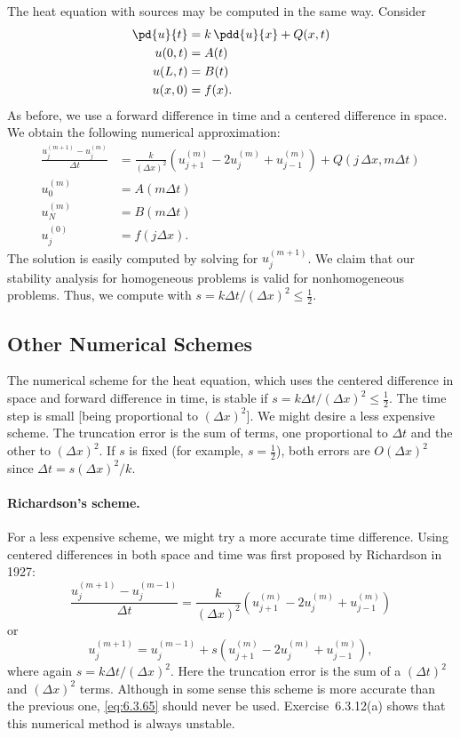 The heat equation with sources may be computed in the same way.  Consider
\begin{align*}
\pd{u}{t} &= k\,\pdd{u}{x} + Q(x,t) \\
u(0,t) &= A(t) \\
u(L,t) &= B(t) \\
u(x,0) &= f(x).
\end{align*}
As before, we use a forward difference in time and a centered difference in space.  We obtain the following numerical approximation:
\begin{align*}
\frac{u_j^{(m+1)} - u_j^{(m)}}{\Delta t} &= \frac{k}{(\Delta x)^2}\left(u_{j+1}^{(m)} - 2u_j^{(m)} + u_{j-1}^{(m)}\right) + Q(j\,\Delta x, m\Delta t) \\
u_0^{(m)} &= A(m\Delta t) \\
u_N^{(m)} &= B(m\Delta t) \\
u_j^{(0)} &= f(j\Delta x).
\end{align*}
The solution is easily computed by solving for $u_j^{(m+1)}$.  We claim that our stability analysis for homogeneous problems is valid for nonhomogeneous problems.  Thus, we compute with $s = k\Delta t/(\Delta x)^2 \le \frac{1}{2}$.

\subsection{Other Numerical Schemes}
\label{sec:fd-heat-other}

The numerical scheme for the heat equation, which uses the centered difference in space and forward difference in time, is stable if $s = k\Delta t/(\Delta x)^2 \le \frac{1}{2}$.  The time step is small [being proportional to $(\Delta x)^2$].  We might desire a less expensive scheme.  The truncation error is the sum of terms, one proportional to $\Delta t$ and the other to $(\Delta x)^2$.  If $s$ is fixed (for example, $s = \frac{1}{2}$), both errors are $O(\Delta x)^2$ since $\Delta t = s(\Delta x)^2/k$.

\paragraph{Richardson's scheme.}
For a less expensive scheme, we might try a more accurate time difference.  Using centered differences in both space and time was first proposed by Richardson in 1927:
\begin{equation}
\frac{u_j^{(m+1)} - u_j^{(m-1)}}{\Delta t} = \frac{k}{(\Delta x)^2}\left(u_{j+1}^{(m)} - 2u_j^{(m)} + u_{j-1}^{(m)}\right)
\label{eq:6.3.64}
\end{equation}
or
\begin{equation}
u_j^{(m+1)} = u_j^{(m-1)} + s\left(u_{j+1}^{(m)} - 2u_j^{(m)} + u_{j-1}^{(m)}\right),
\label{eq:6.3.65}
\end{equation}
where again $s = k\Delta t/(\Delta x)^2$.  Here the truncation error is the sum of a $(\Delta t)^2$ and $(\Delta x)^2$ terms.  Although in some sense this scheme is more accurate than the previous one, \eqref{eq:6.3.65} should never be used.  Exercise~6.3.12(a) shows that this numerical method is always unstable.


